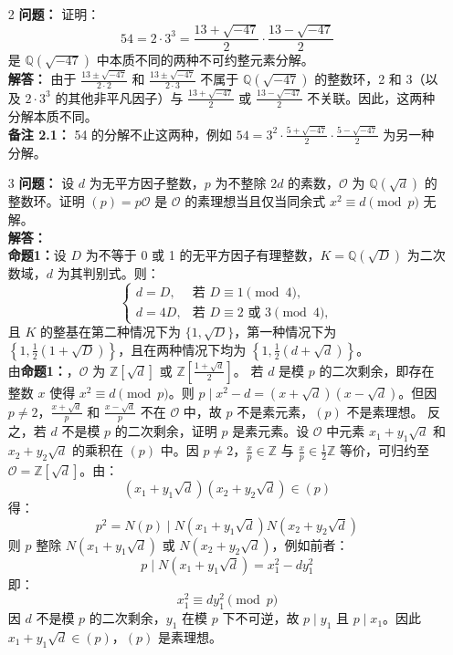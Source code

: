 \documentclass[UTF8]{ctexart}
\begin{document}
\begin{enumerate}
\begin{enumerate}
\item[2] 
\textbf{问题：} 证明：
\[
54 = 2 \cdot 3^3 = \frac{13 + \sqrt{-47}}{2} \cdot \frac{13 - \sqrt{-47}}{2}
\]
是 \(\mathbb{Q}(\sqrt{-47})\) 中本质不同的两种不可约整元素分解。\\
\textbf{解答：} 由于 \(\frac{13 \pm \sqrt{-47}}{2 \cdot 2}\) 和 \(\frac{13 \pm \sqrt{-47}}{2 \cdot 3}\) 不属于 \(\mathbb{Q}(\sqrt{-47})\) 的整数环，2 和 3（以及 \(2 \cdot 3^3\) 的其他非平凡因子）与 \(\frac{13 + \sqrt{-47}}{2}\) 或 \(\frac{13 - \sqrt{-47}}{2}\) 不关联。因此，这两种分解本质不同。\\
\textbf{备注 2.1：} 54 的分解不止这两种，例如 \(54 = 3^2 \cdot \frac{5 + \sqrt{-47}}{2} \cdot \frac{5 - \sqrt{-47}}{2}\) 为另一种分解。

\item[3] 
\textbf{问题：} 设 \(d\) 为无平方因子整数，\(p\) 为不整除 \(2d\) 的素数，\(\mathcal{O}\) 为 \(\mathbb{Q}(\sqrt{d})\) 的整数环。证明 \((p) = p \mathcal{O}\) 是 \(\mathcal{O}\) 的素理想当且仅当同余式 \(x^2 \equiv d \pmod{p}\) 无解。\\
\textbf{解答：} \\
\textbf{命题1：}设 \(D\) 为不等于 0 或 1 的无平方因子有理整数，\(K = \mathbb{Q}(\sqrt{D})\) 为二次数域，\(d\) 为其判别式。则：
\[
\begin{cases}
d = D, & \text{若 } D \equiv 1 \pmod{4}, \\
d = 4D, & \text{若 } D \equiv 2 \text{ 或 } 3 \pmod{4},
\end{cases}
\]
且 \(K\) 的整基在第二种情况下为 \(\{1, \sqrt{D}\}\)，第一种情况下为 \(\left\{1, \frac{1}{2}(1 + \sqrt{D})\right\}\)，且在两种情况下均为 \(\left\{1, \frac{1}{2}(d + \sqrt{d})\right\}\)。\\

由\textbf{命题1：}，\(\mathcal{O}\) 为 \(\mathbb{Z}[\sqrt{d}]\) 或 \(\mathbb{Z}\left[\frac{1 + \sqrt{d}}{2}\right]\)。  
若 \(d\) 是模 \(p\) 的二次剩余，即存在整数 \(x\) 使得 \(x^2 \equiv d \pmod{p}\)。则 \(p \mid x^2 - d = (x + \sqrt{d})(x - \sqrt{d})\)。但因 \(p \neq 2\)，\(\frac{x + \sqrt{d}}{p}\) 和 \(\frac{x - \sqrt{d}}{p}\) 不在 \(\mathcal{O}\) 中，故 \(p\) 不是素元素，\((p)\) 不是素理想。  
反之，若 \(d\) 不是模 \(p\) 的二次剩余，证明 \(p\) 是素元素。设 \(\mathcal{O}\) 中元素 \(x_1 + y_1 \sqrt{d}\) 和 \(x_2 + y_2 \sqrt{d}\) 的乘积在 \((p)\) 中。因 \(p \neq 2\)，\(\frac{x}{p} \in \mathbb{Z}\) 与 \(\frac{x}{p} \in \frac{1}{2} \mathbb{Z}\) 等价，可归约至 \(\mathcal{O} = \mathbb{Z}[\sqrt{d}]\)。由：
\[
(x_1 + y_1 \sqrt{d})(x_2 + y_2 \sqrt{d}) \in (p)
\]
得：
\[
p^2 = N(p) \mid N(x_1 + y_1 \sqrt{d}) N(x_2 + y_2 \sqrt{d})
\]
则 \(p\) 整除 \(N(x_1 + y_1 \sqrt{d})\) 或 \(N(x_2 + y_2 \sqrt{d})\)，例如前者：
\[
p \mid N(x_1 + y_1 \sqrt{d}) = x_1^2 - d y_1^2
\]
即：
\[
x_1^2 \equiv d y_1^2 \pmod{p}
\]
因 \(d\) 不是模 \(p\) 的二次剩余，\(y_1\) 在模 \(p\) 下不可逆，故 \(p \mid y_1\) 且 \(p \mid x_1\)。因此 \(x_1 + y_1 \sqrt{d} \in (p)\)，\((p)\) 是素理想。


\end{enumerate}
\end{enumerate}
\end{document}
